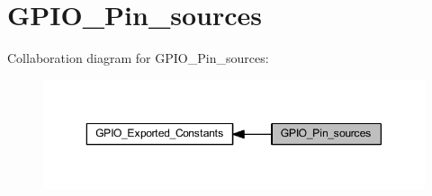 \hypertarget{group___g_p_i_o___pin__sources}{}\section{G\+P\+I\+O\+\_\+\+Pin\+\_\+sources}
\label{group___g_p_i_o___pin__sources}
Collaboration diagram for G\+P\+I\+O\+\_\+\+Pin\+\_\+sources\+:
\nopagebreak
\begin{figure}[H]
\begin{center}
\leavevmode
\includegraphics[width=350pt]{group___g_p_i_o___pin__sources}
\end{center}
\end{figure}
